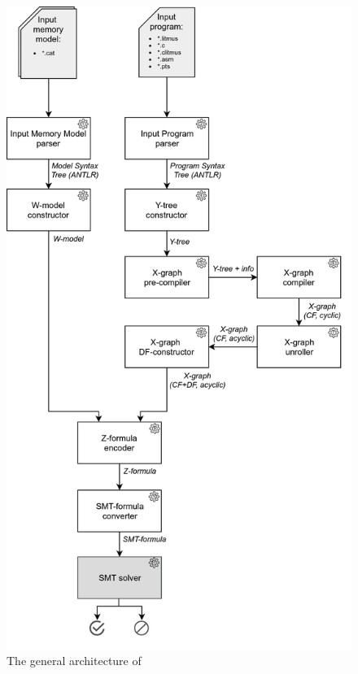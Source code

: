 \begin{figure}
  \centering
  \includegraphics[height=.99\textheight,keepaspectratio]{img/my/draw.io/general_arch.png}
  \caption{The general architecture of \porthos[2]}
  \label{fig:arch}
\end{figure}

